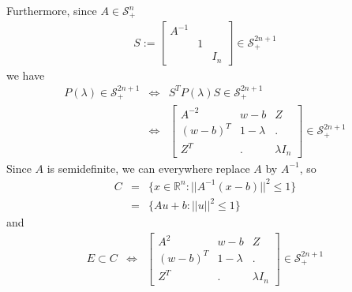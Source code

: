 \documentclass{article}
\begin{document}
Furthermore, since $A\in\mathcal{S}^n_+$
\begin{eqnarray}
S := \left[
    \begin{array}{ccc}
     A^{-1} \\
     & 1 \\
     && I_n
    \end{array}
\right]\in\mathcal{S}^{2n+1}_+
\end{eqnarray}
we have 
\begin{eqnarray}
    P(\lambda) \in \mathcal{S}^{2n+1}_+ 
    & \Leftrightarrow &
    S^T P(\lambda) S \in\mathcal{S}^{2n+1}_+ \\
    & \Leftrightarrow &
    \left[
        \begin{array}{ccc}
            A^{-2}  & w-b        & Z \\
            (w-b)^T & 1-\lambda  & . \\
            Z^T     & .          & \lambda I_n
        \end{array}
    \right]\in\mathcal{S}^{2n+1}_+
\end{eqnarray}
Since $A$ is semidefinite, we can everywhere replace $A$ by $A^{-1}$, so 
\begin{eqnarray}
C &=& \{ x\in\mathbb{R}^n : ||A^{-1}(x-b)||^2 \leq 1 \} \\
  &=& \{ Au+b: ||u||^2\leq 1 \} 
\end{eqnarray}
and 
\begin{eqnarray}
E \subset C &\Leftrightarrow& 
    \left[
        \begin{array}{ccc}
            A^2  & w-b           & Z \\
            (w-b)^T & 1-\lambda  & . \\
            Z^T     & .          & \lambda I_n
        \end{array}
    \right]\in\mathcal{S}^{2n+1}_+
\end{eqnarray}



%
%
\end{document}
